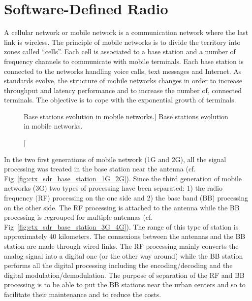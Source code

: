 \section{Software-Defined Radio}

A cellular network or mobile network is a communication network where the last
link is wireless. The principle of mobile networks is to divide the territory
into zones called ``cells''. Each cell is associated to a base station and a
number of frequency channels to communicate with mobile terminals. Each base
station is connected to the networks handling voice calls, text messages and
Internet. As standards evolve, the structure of mobile networks changes in order
to increase throughput and latency performance and to increase the number of,
connected terminals. The objective is to cope with the exponential growth of
terminals.


\begin{figure}[htp]
  \centering
  \quad{}
  \quad{}
  \caption
    [Base stations evolution in mobile networks.]
    {Base stations evolution in mobile networks.}
  \label{fig:ctx_sdr_base_station}
\end{figure}

In the two first generations of mobile network (1G and 2G), all the signal
processing was treated in the base station near the antenna (cf.
Fig~\ref{fig:ctx_sdr_base_station_1G_2G}). Since the third generation of mobile
networks (3G) two types of processing have been separated: 1) the radio
frequency (RF) processing on the one side and 2) the base band (BB) processing
on the other side. The RF processing is attached to the antenna while the BB
processing is regrouped for multiple antennas (cf.
Fig~\ref{fig:ctx_sdr_base_station_3G_4G}). The range of this type of station is
approximately 40 kilometers. The connexions between the antennas and the BB
station are made through wired links. The RF processing mainly converts the
analog signal into a digital one (or the other way around) while the BB station
performs all the digital processing including the encoding/decoding and the
digital modulation/demodulation. The purpose of separation of the RF and BB
processing is to be able to put the BB stations near the urban centers and so to
facilitate their maintenance and to reduce the costs.

